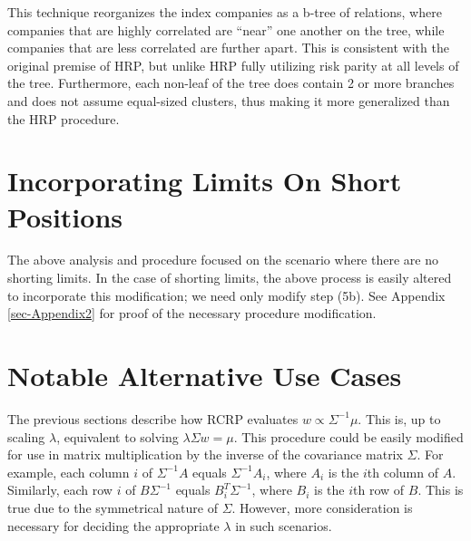 \documentclass[10pt,twoside,titlepage]{article}   %
\begin{document}
This technique reorganizes the index companies as a b-tree of relations, where companies that are highly correlated are “near” one another on the tree, 
while companies that are less correlated are further apart. 
This is consistent with the original premise of HRP, but unlike HRP fully utilizing risk parity at all levels of the tree. 
Furthermore, each non-leaf of the tree does contain 2 or more branches and does not assume equal-sized clusters, thus making it more generalized than the HRP procedure.


\section{Incorporating Limits On Short Positions}\label{sec-LimitShorts}
The above analysis and procedure focused on the scenario where there are no shorting limits. 
In the case of shorting limits, the above process is easily altered to incorporate this modification; we need only modify step (5b).
See Appendix \ref{sec-Appendix2} for proof of the necessary procedure modification.


\section{Notable Alternative Use Cases}\label{sec-AltUseCase}
The previous sections describe how RCRP evaluates $w \propto \Sigma^{-1}\mu$. This is, up to scaling $\lambda$, equivalent to solving $\lambda \Sigma w = \mu$. 
This procedure could be easily modified for use in matrix multiplication by the inverse of the covariance matrix $\Sigma$. 
For example, each column $i$ of $\Sigma^{-1}A$ equals $\Sigma^{-1}A_i$, where $A_i$ is the $i$th column of $A$. 
Similarly, each row $i$ of $B\Sigma^{-1}$ equals $B_i^T\Sigma^{-1}$, where $B_i$ is the $i$th row of $B$.
This is true due to the symmetrical nature of $\Sigma$. 
However, more consideration is necessary for deciding the appropriate $\lambda$ in such scenarios.
\end{document}

